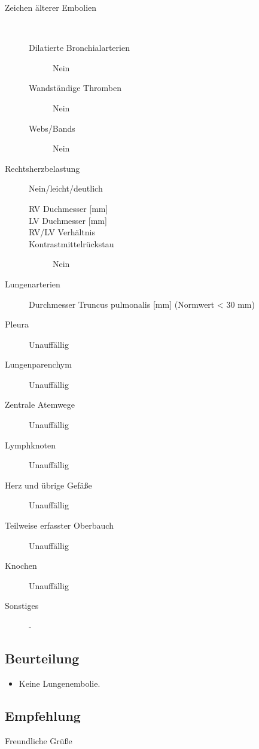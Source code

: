 \documentclass{scrartcl}
\begin{document}
\begin{letter}{\addressee{}}
\begin{description}
  \item[Zeichen älterer Embolien] \ 
    \begin{description}
    \item[Dilatierte Bronchialarterien] Nein
    \item[Wandständige Thromben] Nein
    \item[Webs/Bands] Nein
    \end{description}

  \item[Rechtsherzbelastung] Nein/leicht/deutlich
    \begin{description}
    \item[RV Duchmesser {[}mm{]}]
    \item[LV Duchmesser {[}mm{]}]
    \item[RV/LV Verhältnis]
    \item[Kontrastmittelrückstau] Nein
    \end{description}
    
  \item[Lungenarterien]
    \begin{description}
    \item[Durchmesser Truncus pulmonalis {[}mm{]} (Normwert \textless{} 30
      mm)]
    \end{description}

  \item[Pleura] Unauffällig
  \item[Lungenparenchym] Unauffällig
  \item[Zentrale Atemwege] Unauffällig
  \item[Lymphknoten] Unauffällig
  \item[Herz und übrige Gefäße] Unauffällig
  \item[Teilweise erfasster Oberbauch] Unauffällig
  \item[Knochen] Unauffällig
  \item[Sonstiges] -

  \end{description}

  \subsection*{Beurteilung}
  \begin{itemize}
  \item Keine Lungenembolie.
  \end{itemize}

  \subsection*{Empfehlung}

  \closing{Freundliche Grüße}

\end{letter}
\end{document}
